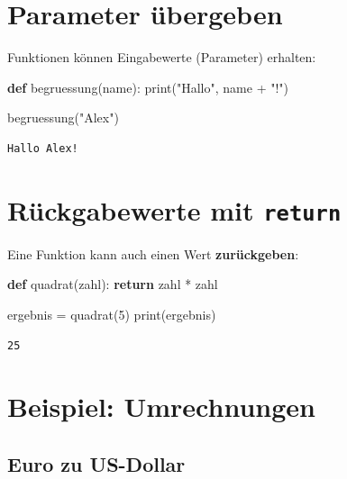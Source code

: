 \documentclass[
  letterpaper,
  DIV=11,
  numbers=noendperiod]{scrreprt}
\newenvironment{Shaded}{\begin{snugshade}}{\end{snugshade}}
\newcommand{\BuiltInTok}[1]{\textcolor[rgb]{0.00,0.23,0.31}{#1}}
\newcommand{\ControlFlowTok}[1]{\textcolor[rgb]{0.00,0.23,0.31}{\textbf{#1}}}
\newcommand{\DecValTok}[1]{\textcolor[rgb]{0.68,0.00,0.00}{#1}}
\newcommand{\KeywordTok}[1]{\textcolor[rgb]{0.00,0.23,0.31}{\textbf{#1}}}
\newcommand{\NormalTok}[1]{\textcolor[rgb]{0.00,0.23,0.31}{#1}}
\newcommand{\OperatorTok}[1]{\textcolor[rgb]{0.37,0.37,0.37}{#1}}
\newcommand{\StringTok}[1]{\textcolor[rgb]{0.13,0.47,0.30}{#1}}
\begin{document}
\section{Parameter übergeben}\label{parameter-uxfcbergeben}

Funktionen können Eingabewerte (Parameter) erhalten:

\begin{Shaded}
\begin{Highlighting}[]
\KeywordTok{def}\NormalTok{ begruessung(name):}
    \BuiltInTok{print}\NormalTok{(}\StringTok{"Hallo"}\NormalTok{, name }\OperatorTok{+} \StringTok{"!"}\NormalTok{)}

\NormalTok{begruessung(}\StringTok{"Alex"}\NormalTok{)}
\end{Highlighting}
\end{Shaded}

\begin{verbatim}
Hallo Alex!
\end{verbatim}

\section{\texorpdfstring{Rückgabewerte mit
\texttt{return}}{Rückgabewerte mit return}}\label{ruxfcckgabewerte-mit-return}

Eine Funktion kann auch einen Wert \textbf{zurückgeben}:

\begin{Shaded}
\begin{Highlighting}[]
\KeywordTok{def}\NormalTok{ quadrat(zahl):}
    \ControlFlowTok{return}\NormalTok{ zahl }\OperatorTok{*}\NormalTok{ zahl}

\NormalTok{ergebnis }\OperatorTok{=}\NormalTok{ quadrat(}\DecValTok{5}\NormalTok{)}
\BuiltInTok{print}\NormalTok{(ergebnis)}
\end{Highlighting}
\end{Shaded}

\begin{verbatim}
25
\end{verbatim}

\section{Beispiel: Umrechnungen}\label{beispiel-umrechnungen}

\subsection{Euro zu US-Dollar}\label{euro-zu-us-dollar}
\end{document}

